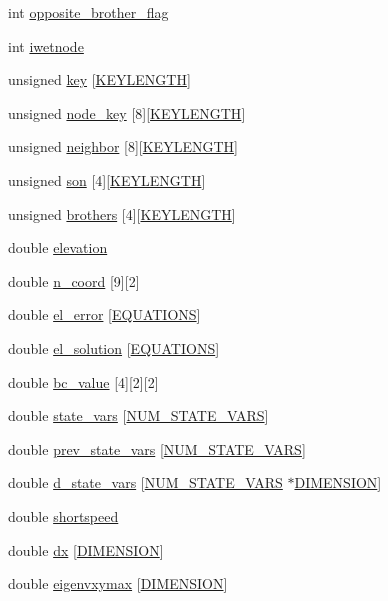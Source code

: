 \begin{CompactItemize}
\item 
int \hyperlink{structElemPack_o18}{opposite\_\-brother\_\-flag}
\item 
int \hyperlink{structElemPack_o19}{iwetnode}
\item 
unsigned \hyperlink{structElemPack_o20}{key} \mbox{[}\hyperlink{constant_8h_a10}{KEYLENGTH}\mbox{]}
\item 
unsigned \hyperlink{structElemPack_o21}{node\_\-key} \mbox{[}8\mbox{]}\mbox{[}\hyperlink{constant_8h_a10}{KEYLENGTH}\mbox{]}
\item 
unsigned \hyperlink{structElemPack_o22}{neighbor} \mbox{[}8\mbox{]}\mbox{[}\hyperlink{constant_8h_a10}{KEYLENGTH}\mbox{]}
\item 
unsigned \hyperlink{structElemPack_o23}{son} \mbox{[}4\mbox{]}\mbox{[}\hyperlink{constant_8h_a10}{KEYLENGTH}\mbox{]}
\item 
unsigned \hyperlink{structElemPack_o24}{brothers} \mbox{[}4\mbox{]}\mbox{[}\hyperlink{constant_8h_a10}{KEYLENGTH}\mbox{]}
\item 
double \hyperlink{structElemPack_o25}{elevation}
\item 
double \hyperlink{structElemPack_o26}{n\_\-coord} \mbox{[}9\mbox{]}\mbox{[}2\mbox{]}
\item 
double \hyperlink{structElemPack_o27}{el\_\-error} \mbox{[}\hyperlink{constant_8h_a16}{EQUATIONS}\mbox{]}
\item 
double \hyperlink{structElemPack_o28}{el\_\-solution} \mbox{[}\hyperlink{constant_8h_a16}{EQUATIONS}\mbox{]}
\item 
double \hyperlink{structElemPack_o29}{bc\_\-value} \mbox{[}4\mbox{]}\mbox{[}2\mbox{]}\mbox{[}2\mbox{]}
\item 
double \hyperlink{structElemPack_o30}{state\_\-vars} \mbox{[}\hyperlink{constant_8h_a45}{NUM\_\-STATE\_\-VARS}\mbox{]}
\item 
double \hyperlink{structElemPack_o31}{prev\_\-state\_\-vars} \mbox{[}\hyperlink{constant_8h_a45}{NUM\_\-STATE\_\-VARS}\mbox{]}
\item 
double \hyperlink{structElemPack_o32}{d\_\-state\_\-vars} \mbox{[}\hyperlink{constant_8h_a45}{NUM\_\-STATE\_\-VARS} $\ast$\hyperlink{constant_8h_a15}{DIMENSION}\mbox{]}
\item 
double \hyperlink{structElemPack_o33}{shortspeed}
\item 
double \hyperlink{structElemPack_o34}{dx} \mbox{[}\hyperlink{constant_8h_a15}{DIMENSION}\mbox{]}
\item 
double \hyperlink{structElemPack_o35}{eigenvxymax} \mbox{[}\hyperlink{constant_8h_a15}{DIMENSION}\mbox{]}

\end{CompactItemize}

